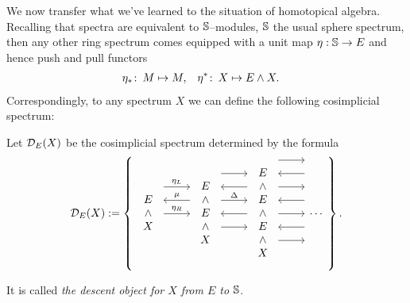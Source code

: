 We now transfer what we've learned to the situation of homotopical algebra.  Recalling that spectra are equivalent to $\S$--modules, $\S$ the usual sphere spectrum, then any other ring spectrum comes equipped with a unit map $\eta: \S \to E$ and hence push and pull functors
\begin{align*}
\eta_*\co M & \mapsto M, &
\eta^*\co X & \mapsto E \sm X.
\end{align*}
Correspondingly, to any spectrum $X$ we can define the following cosimplicial spectrum:
\begin{definition}
Let $\sheaf D_E(X)$ be the cosimplicial spectrum determined by the formula
\[\mathcal{D}_E(X) := \left\{
\begin{tikzcd}
\begin{array}{c} E \\ \sm \\ X \end{array} \arrow[leftarrow, shift left=\baselineskip]{r}{\mu} \arrow[shift left=(2*\baselineskip)]{r}{\eta_L} \arrow{r}{\eta_R} &
\begin{array}{c} E \\ \sm \\ E \\ \sm \\ X \end{array} \arrow[shift left=(3*\baselineskip)]{r} \arrow[leftarrow, shift left=(2*\baselineskip)]{r} \arrow[shift left=\baselineskip]{r}{\Delta} \arrow[leftarrow]{r} \arrow[shift right=\baselineskip]{r} &
\begin{array}{c} E \\ \sm \\ E \\ \sm \\ E \\ \sm \\ X \end{array} \arrow[shift left=(4*\baselineskip)]{r} \arrow[leftarrow, shift left=(3*\baselineskip)]{r} \arrow[shift left=(2*\baselineskip)]{r} \arrow[leftarrow, shift left=\baselineskip]{r} \arrow{r} \arrow[leftarrow, shift right=\baselineskip]{r} \arrow[shift right=(2*\baselineskip)]{r} &
\cdots
\end{tikzcd}
\right\}.\]

It is called \textit{the descent object for $X$ from $E$ to $\S$}.
\end{definition}

